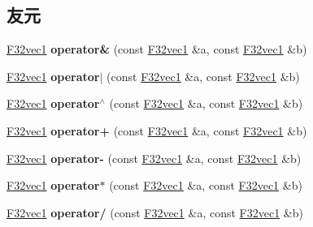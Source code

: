 \subsection*{友元}
\begin{DoxyCompactItemize}
\item 
\mbox{\label{class_f32vec1_aeba419b3fbcf00a87b38f3b3736caf49}} 
\hyperlink{class_f32vec1}{F32vec1} {\bfseries operator\&} (const \hyperlink{class_f32vec1}{F32vec1} \&a, const \hyperlink{class_f32vec1}{F32vec1} \&b)
\item 
\mbox{\label{class_f32vec1_abc80dcfecc6870fa2099b1b3257d8608}} 
\hyperlink{class_f32vec1}{F32vec1} {\bfseries operator$\vert$} (const \hyperlink{class_f32vec1}{F32vec1} \&a, const \hyperlink{class_f32vec1}{F32vec1} \&b)
\item 
\mbox{\label{class_f32vec1_a1fff7a0e81c5c3247e58e4d229f62a29}} 
\hyperlink{class_f32vec1}{F32vec1} {\bfseries operator$^\wedge$} (const \hyperlink{class_f32vec1}{F32vec1} \&a, const \hyperlink{class_f32vec1}{F32vec1} \&b)
\item 
\mbox{\label{class_f32vec1_af64462957cd4d9d52047647eef40c8ab}} 
\hyperlink{class_f32vec1}{F32vec1} {\bfseries operator+} (const \hyperlink{class_f32vec1}{F32vec1} \&a, const \hyperlink{class_f32vec1}{F32vec1} \&b)
\item 
\mbox{\label{class_f32vec1_a49127895e405e78e31fd4a6a1285a06e}} 
\hyperlink{class_f32vec1}{F32vec1} {\bfseries operator-\/} (const \hyperlink{class_f32vec1}{F32vec1} \&a, const \hyperlink{class_f32vec1}{F32vec1} \&b)
\item 
\mbox{\label{class_f32vec1_a4ecf29125133b0245d81fc8e663239d6}} 
\hyperlink{class_f32vec1}{F32vec1} {\bfseries operator$\ast$} (const \hyperlink{class_f32vec1}{F32vec1} \&a, const \hyperlink{class_f32vec1}{F32vec1} \&b)
\item 
\mbox{\label{class_f32vec1_ab2a79370deab57aea802afc88b929733}} 
\hyperlink{class_f32vec1}{F32vec1} {\bfseries operator/} (const \hyperlink{class_f32vec1}{F32vec1} \&a, const \hyperlink{class_f32vec1}{F32vec1} \&b)
\item 
\mbox{\label{class_f32vec1_a73789e2cdc4bceca70aae29ef9289899}} 

\end{DoxyCompactItemize}
